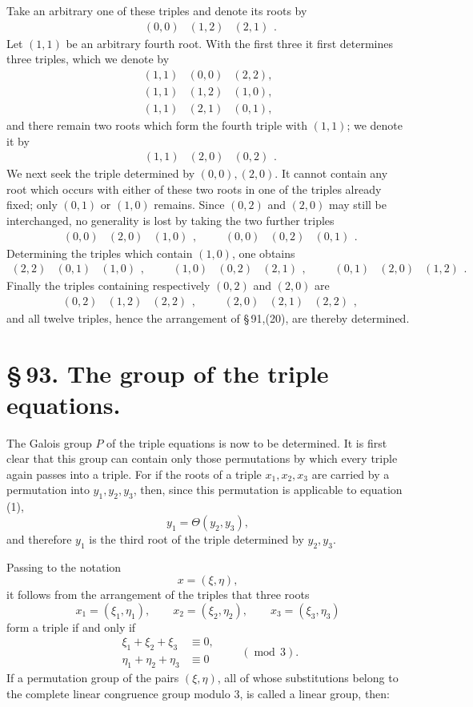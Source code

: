 \documentclass[11pt]{article}
\providecommand{\trip}[3]{\begin{array}{ccc}#1&#2&#3\end{array}}
\begin{document}
Take an arbitrary one of these triples and denote its roots by
\[
\trip{(0,0)}{(1,2)}{(2,1)}.
\]
Let \((1,1)\) be an arbitrary fourth root. With the first three it first determines three triples, which we denote by
\[
\begin{array}{ccc}
(1,1)&(0,0)&(2,2),\\
(1,1)&(1,2)&(1,0),\\
(1,1)&(2,1)&(0,1),
\end{array}
\]
and there remain two roots which form the fourth triple with \((1,1)\); we denote it by
\[
\trip{(1,1)}{(2,0)}{(0,2)}.
\]
We next seek the triple determined by \((0,0),(2,0)\). It cannot contain any root which occurs with either of these two roots in one of the triples already fixed; only \((0,1)\) or \((1,0)\) remains. Since \((0,2)\) and \((2,0)\) may still be interchanged, no generality is lost by taking the two further triples
\[
\trip{(0,0)}{(2,0)}{(1,0)},
\qquad
\trip{(0,0)}{(0,2)}{(0,1)}.
\]
Determining the triples which contain \((1,0)\), one obtains
\[
\trip{(2,2)}{(0,1)}{(1,0)},
\qquad
\trip{(1,0)}{(0,2)}{(2,1)},
\qquad
\trip{(0,1)}{(2,0)}{(1,2)}.
\]
Finally the triples containing respectively \((0,2)\) and \((2,0)\) are
\[
\trip{(0,2)}{(1,2)}{(2,2)},
\qquad
\trip{(2,0)}{(2,1)}{(2,2)},
\]
and all twelve triples, hence the arrangement of \S\,91,(20), are thereby determined.

\section*{\S\,93. The group of the triple equations.}

The Galois group \(P\) of the triple equations is now to be determined. It is first clear that this group can contain only those permutations by which every triple again passes into a triple. For if the roots of a triple \(x_1,x_2,x_3\) are carried by a permutation into \(y_1,y_2,y_3\), then, since this permutation is applicable to equation (1),
\[
 y_1=\Theta(y_2,y_3),
\]
and therefore \(y_1\) is the third root of the triple determined by \(y_2,y_3\).

Passing to the notation
\begin{equation}
 x=(\xi,\eta),
 \tag{1}
\end{equation}
it follows from the arrangement of the triples that three roots
\begin{equation}
 x_1=(\xi_1,\eta_1),\qquad x_2=(\xi_2,\eta_2),\qquad x_3=(\xi_3,\eta_3)
 \tag{2}
\end{equation}
form a triple if and only if
\begin{equation}
\begin{aligned}
 \xi_1+\xi_2+\xi_3&\equiv 0,\\
 \eta_1+\eta_2+\eta_3&\equiv 0
\end{aligned}
\qquad (\operatorname{mod}\,3).
\tag{3}
\end{equation}
If a permutation group of the pairs \((\xi,\eta)\), all of whose substitutions belong to the complete linear congruence group modulo 3, is called a linear group, then:
\end{document}
